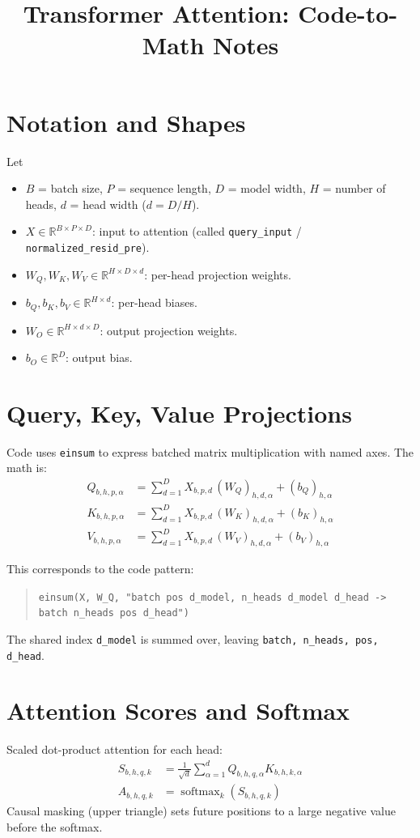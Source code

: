 \documentclass[11pt]{article}
\title{Transformer Attention: Code-to-Math Notes}
\author{}
\date{}
\begin{document}
\maketitle

\section*{Notation and Shapes}
Let
\begin{itemize}
  \item $B$ = batch size, $P$ = sequence length, $D$ = model width, $H$ = number of heads, $d$ = head width ($d = D/H$).
  \item $X \in \mathbb{R}^{B \times P \times D}$: input to attention (called \texttt{query\_input} / \texttt{normalized\_resid\_pre}).
  \item $W_Q, W_K, W_V \in \mathbb{R}^{H \times D \times d}$: per-head projection weights.
  \item $b_Q, b_K, b_V \in \mathbb{R}^{H \times d}$: per-head biases.
  \item $W_O \in \mathbb{R}^{H \times d \times D}$: output projection weights.
  \item $b_O \in \mathbb{R}^{D}$: output bias.
\end{itemize}

\section*{Query, Key, Value Projections}
Code uses \texttt{einsum} to express batched matrix multiplication with named axes. The math is:
\begin{align}
Q_{b,h,p,\alpha} &= \sum_{d=1}^{D} X_{b,p,d}\,(W_Q)_{h,d,\alpha} + (b_Q)_{h,\alpha} \\
K_{b,h,p,\alpha} &= \sum_{d=1}^{D} X_{b,p,d}\,(W_K)_{h,d,\alpha} + (b_K)_{h,\alpha} \\
V_{b,h,p,\alpha} &= \sum_{d=1}^{D} X_{b,p,d}\,(W_V)_{h,d,\alpha} + (b_V)_{h,\alpha}
\end{align}

This corresponds to the code pattern:
\begin{quote}
\texttt{einsum(X, W\_Q, "batch pos d\_model, n\_heads d\_model d\_head -> batch n\_heads pos d\_head")}
\end{quote}
The shared index \texttt{d\_model} is summed over, leaving \texttt{batch, n\_heads, pos, d\_head}.

\section*{Attention Scores and Softmax}
Scaled dot-product attention for each head:
\begin{align}
S_{b,h,q,k} &= \frac{1}{\sqrt{d}} \sum_{\alpha=1}^{d} Q_{b,h,q,\alpha} K_{b,h,k,\alpha} \\
A_{b,h,q,k} &= \operatorname{softmax}_k(S_{b,h,q,k})
\end{align}
Causal masking (upper triangle) sets future positions to a large negative value before the softmax.
\end{document}
